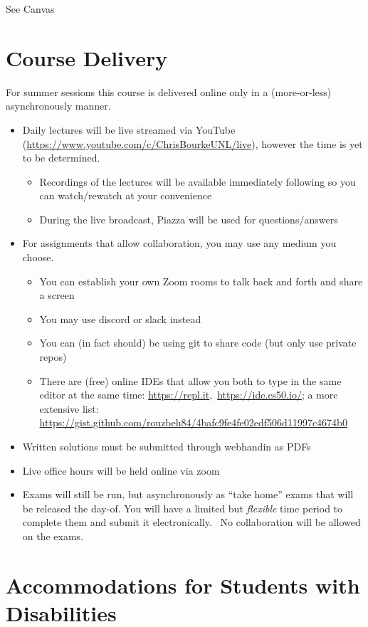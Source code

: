 \documentclass[12pt]{scrartcl}
\begin{document}
See Canvas

\section{Course Delivery}

For summer sessions this course is delivered online only in a (more-or-less) 
asynchronously manner.  
\begin{itemize}
  \item Daily lectures will be live streamed via 
  YouTube (\url{https://www.youtube.com/c/ChrisBourkeUNL/live}), however 
  the time is yet to be determined. 
  \begin{itemize}
    \item Recordings of the lectures will be available 
    immediately following so you can watch/rewatch at your convenience
    \item During the live broadcast, Piazza will be used for 
    questions/answers
  \end{itemize}
  \item For assignments that allow collaboration, you may use any medium
  you choose.  
  \begin{itemize}
    \item You can establish your own Zoom rooms to talk back and forth 
    and share a screen
    \item You may use discord or slack instead
    \item You can (in fact should) be using git to share code (but 
    only use private repos)
    \item There are (free) online IDEs that allow you both to type in the same 
    editor at the same time: \url{https://repl.it}, \url{https://ide.cs50.io/};
    a more extensive list: \url{https://gist.github.com/rouzbeh84/4bafc9fe4fe02edf506d11997c4674b0}
  \end{itemize}
  \item Written solutions must be submitted through webhandin as PDFs
  \item Live office hours will be held online via zoom 
  \item Exams will still be run, but asynchronously as ``take home'' exams 
  that will be released the day-of.  You will have a limited but 
  \emph{flexible} time period to complete them and submit it electronically.  
  No collaboration will be allowed on the exams.
\end{itemize}

\section{Accommodations for Students with Disabilities}
\end{document}
